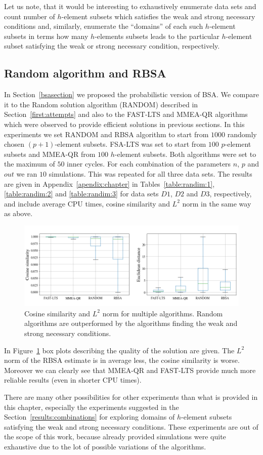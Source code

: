 Let us note, that it would be interesting to exhaustively enumerate data sets and count number of $h$-element subsets which satisfies the weak and strong necessary conditions and, similarly, enumerate the ``domains'' of each such $h$-element subsets in terms how many $h$-elements subsets leads to the particular $h$-element subset satisfying the weak or strong necessary condition, respectively.


\subsection{Random algorithm and RBSA}
In Section~\ref{bsasection} we proposed the probabilistic version of BSA. We compare it to the Random solution algorithm (RANDOM) described in Section~\ref{first:attempts} and also to the FAST-LTS and MMEA-QR algorithms which were observed to provide efficient solutions in previous sections. In this experiments we set RANDOM and RBSA algorithm to start from $1000$ randomly chosen $(p+1)$-element subsets. FSA-LTS was set to start from $100$ $p$-element subsets and MMEA-QR from $100$ $h$-element subsets. Both algorithms were set to the maximum of $50$ inner cycles. For each combination of the parameters $n$, $p$ and $out$ we ran $10$ simulations. This was repeated for all three data sets. The results are given in Appendix~\ref{apendix:chapter} in Tables~\ref{table:randim:1}, \ref{table:randim:2} and \ref{table:randim:3} for data sets $D1$, $D2$ and $D3$, respectively, and include average CPU times, cosine similarity and $L^2$ norm in the same way as above.

\begin{figure}[h]
    \centering
    \includegraphics[width=12cm]{img/random_box}

    \caption{Cosine similarity and $L^2$ norm for multiple algorithms. Random algorithms are outperformed by the algorithms finding the weak and strong necessary conditions.}
    \label{randim:box}
\end{figure}

In Figure~\ref{randim:box} box plots describing the quality of the solution are given. The $L^2$ norm of the RBSA estimate is in average less, the cosine similarity is worse. Moreover we can clearly see that MMEA-QR and FAST-LTS provide much more reliable results (even in shorter CPU times).

There are many other possibilities for other experiments than what is provided in this chapter, especially the experiments suggested in the Section~\ref{results:combinations} for exploring domains of $h$-element subsets satisfying the weak and strong necessary conditions. These experiments are out of the scope of this work, because already provided simulations were quite exhaustive due to the lot of possible variations of the algorithms.  